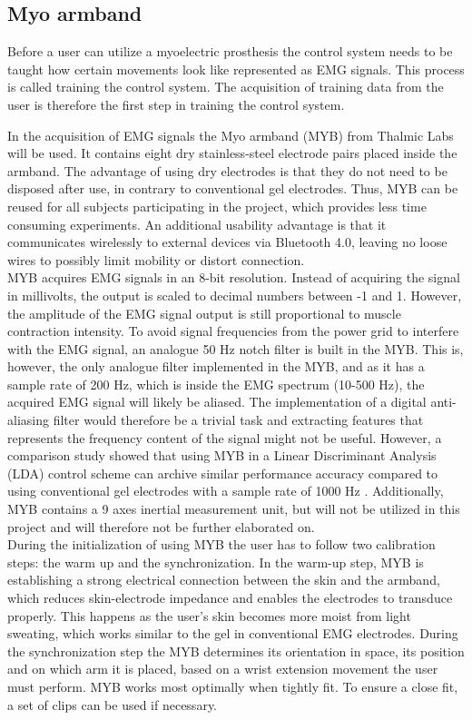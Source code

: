 \subsection{Myo armband} \label{sec:MYO}
Before a user can utilize a myoelectric prosthesis the control system needs to be taught how certain movements look like represented as EMG signals. This process is called training the control system. The acquisition of training data from the user is therefore the first step in training the control system.

In the acquisition of EMG signals the Myo armband (MYB) from Thalmic Labs will be used. It contains eight dry stainless-steel electrode pairs placed inside the armband. The advantage of using dry electrodes is that they do not need to be disposed after use, in contrary to conventional gel electrodes. Thus, MYB can be reused for all subjects participating in the project, which provides less time consuming experiments. An additional usability advantage is that it communicates wirelessly to external devices via Bluetooth 4.0, leaving no loose wires to possibly limit mobility or distort connection. \\ 
MYB acquires EMG signals in an 8-bit resolution. Instead of acquiring the signal in millivolts, the output is scaled to decimal numbers between -1 and 1. However, the amplitude of the EMG signal output is still proportional to muscle contraction intensity. To avoid signal frequencies from the power grid to interfere with the EMG signal, an analogue 50 Hz notch filter is built in the MYB. This is, however, the only analogue filter implemented in the MYB, and as it has a sample rate of 200 Hz, which is inside the EMG spectrum (10-500 Hz), the acquired EMG signal will likely be aliased. The implementation of a digital anti-aliasing filter would therefore be a trivial task and extracting features that represents the frequency content of the signal might not be useful. However, a comparison study showed that using MYB in a Linear Discriminant Analysis (LDA) control scheme can archive similar performance accuracy compared to using conventional gel electrodes with a sample rate of 1000 Hz \cite{Mendez2017}. Additionally, MYB contains a 9 axes inertial measurement unit, but will not be utilized in this project and will therefore not be further elaborated on. \\
During the initialization of using MYB the user has to follow two calibration steps: the warm up and the synchronization. In the warm-up step, MYB is establishing a strong electrical connection between the skin and the armband, which reduces skin-electrode impedance and enables the electrodes to transduce properly. This happens as the user's skin becomes more moist from light sweating, which works similar to the gel in conventional EMG electrodes. During the synchronization step the MYB determines its orientation in space, its position and on which arm it is placed, based on a wrist extension movement the user must perform. 
MYB works most optimally when tightly fit. To ensure a close fit, a set of clips can be used if necessary. 

